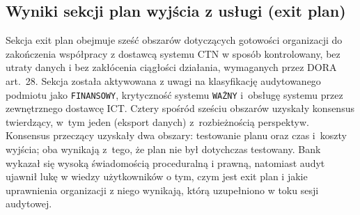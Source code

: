 \subsection{Wyniki sekcji plan wyjścia z usługi (exit plan)}

Sekcja exit plan obejmuje sześć obszarów dotyczących gotowości organizacji do zakończenia współpracy z dostawcą systemu CTN w sposób kontrolowany, bez utraty danych i bez zakłócenia ciągłości działania, wymaganych przez DORA art.~28. Sekcja została aktywowana z uwagi na klasyfikację audytowanego podmiotu jako \texttt{FINANSOWY}, krytyczność systemu \texttt{WAŻNY} i~obsługę systemu przez zewnętrznego dostawcę ICT. Cztery spośród sześciu obszarów uzyskały konsensus twierdzący, w~tym jeden (eksport danych) z~rozbieżnością perspektyw. Konsensus przeczący uzyskały dwa obszary: testowanie planu oraz czas i~koszty wyjścia; oba wynikają z~tego, że plan nie był dotychczas testowany. Bank wykazał się wysoką świadomością proceduralną i prawną, natomiast audyt ujawnił lukę w wiedzy użytkowników o tym, czym jest exit plan i jakie uprawnienia organizacji z niego wynikają, którą uzupełniono w toku sesji audytowej.

